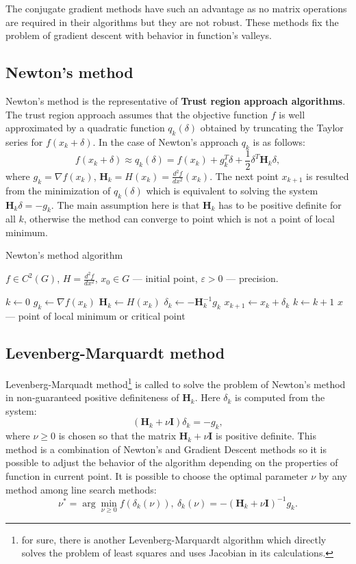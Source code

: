 \documentclass[12pt, bachelor, substylefile = algo_title.rtx]{disser}
\newcommand{\eps}{\varepsilon}
\theoremstyle{definition}
\begin{document}
The conjugate gradient methods have such an advantage as no matrix operations are required in their algorithms but they are not robust. These methods fix the problem of gradient descent with behavior in function's valleys.

\subsection{Newton's method}
Newton's method is the representative of \textbf{Trust region approach algorithms}. The trust region approach assumes that the objective function $f$ is well approximated by a quadratic function $q_k (\delta)$ obtained by truncating the Taylor series for $f(x_k + \delta)$. In the case of Newton's approach $q_k$ is as follows:
\[ f(x_k + \delta) \approx q_k(\delta) = f(x_k) + g_k^T \delta + \frac{1}{2} \delta^T \mathbf{H}_k \delta, \]
where $g_k = \nabla f(x_k)$, $\mathbf{H}_k = H(x_k) = \frac{d^2 f}{dx^2}(x_k)$. The next point $x_{k+1}$ is resulted from the minimization of $q_k(\delta)$ which is equivalent to solving the system $\mathbf{H}_k \delta = -g_k$. The main assumption here is that $\mathbf{H}_k$ has to be positive definite for all $k$, otherwise the method can converge to point which is not a point of local minimum. 

\begin{algorithm}[h]
\caption{Newton's method algorithm}
\label{alg: newton}
\begin{algorithmic}

\Require $f \in C^2(G)$, $H = \frac{d^2 f}{dx^2}$, $x_0 \in G$ --- initial point, $\eps>0$ --- precision. 

\State $k \gets 0$
\While{$\|x_k - x_{k-1}\| > \eps$}
\State $g_k \gets \nabla f(x_k)$
\State $\mathbf{H}_k \gets H(x_k)$
\State $\delta_k \gets -\mathbf{H}^{-1}_k g_k$
\State $x_{k+1} \gets x_{k} + \delta_{k}$
\State $k \gets k+1$
\EndWhile
\Ensure $\widehat{x}$ --- point of local minimum or critical point
\end{algorithmic}
\end{algorithm}

\subsection{Levenberg-Marquardt method}
Levenberg-Marquadt method\footnote{for sure, there is another Levenberg-Marquardt algorithm which directly solves the problem of least squares and uses Jacobian in its calculations.} is called to solve the problem of Newton's method in non-guaranteed positive definiteness of $\mathbf{H}_k$. Here $\delta_k$ is computed from the system:
\[ (\mathbf{H}_k + \nu \mathbf{I})\delta_k = -g_k, \]
where $\nu \ge 0$ is chosen so that the matrix $\mathbf{H}_k + \nu \mathbf{I}$ is positive definite. This method is a combination of Newton's and Gradient Descent methods so it is possible to adjust the behavior of the algorithm depending on the properties of function in current point. It is possible to choose the optimal parameter $\nu$ by any method among line search methods:
\[ \nu^* = \arg \min_{\nu \ge 0} f(\delta_k(\nu)),\  \delta_k(\nu) = -  (\mathbf{H}_k + \nu \mathbf{I})^{-1}g_k.\]
\end{document}
